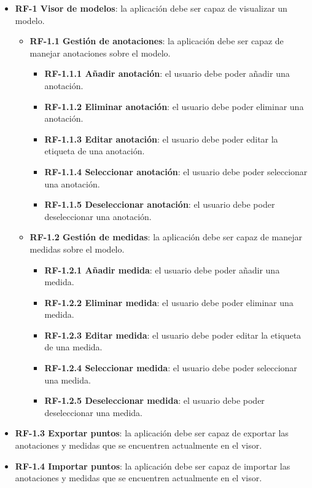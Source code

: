 \begin{itemize}
	\item \textbf{RF-1 Visor de modelos}: la aplicación debe ser capaz de visualizar un modelo.
		\begin{itemize}
		\item \textbf{RF-1.1 Gestión de anotaciones}: la aplicación debe ser capaz de manejar anotaciones sobre el modelo.
			\begin{itemize}
				\item \textbf{RF-1.1.1 Añadir anotación}: el usuario debe poder añadir una anotación.
				\item \textbf{RF-1.1.2 Eliminar anotación}: el usuario debe poder eliminar una anotación.
				\item \textbf{RF-1.1.3 Editar anotación}: el usuario debe poder editar la etiqueta de una anotación.
				\item \textbf{RF-1.1.4 Seleccionar anotación}: el usuario debe poder seleccionar una anotación.
				\item \textbf{RF-1.1.5 Deseleccionar anotación}: el usuario debe poder deseleccionar una anotación.
			\end{itemize}
		\end{itemize}
		\begin{itemize}
			\item \textbf{RF-1.2 Gestión de medidas}: la aplicación debe ser capaz de manejar medidas sobre el modelo.
			\begin{itemize}
				\item \textbf{RF-1.2.1 Añadir medida}: el usuario debe poder añadir una medida.
				\item \textbf{RF-1.2.2 Eliminar medida}: el usuario debe poder eliminar una medida.
				\item \textbf{RF-1.2.3 Editar medida}: el usuario debe poder editar la etiqueta de una medida.
				\item \textbf{RF-1.2.4 Seleccionar medida}: el usuario debe poder seleccionar una medida.
				\item \textbf{RF-1.2.5 Deseleccionar medida}: el usuario debe poder deseleccionar una medida.
			\end{itemize}
		\end{itemize}
		\item \textbf{RF-1.3 Exportar puntos}: la aplicación debe ser capaz de exportar las anotaciones y medidas que se encuentren actualmente en el visor.
		\item \textbf{RF-1.4 Importar puntos}: la aplicación debe ser capaz de importar las anotaciones y medidas que se encuentren actualmente en el visor.


\end{itemize}
